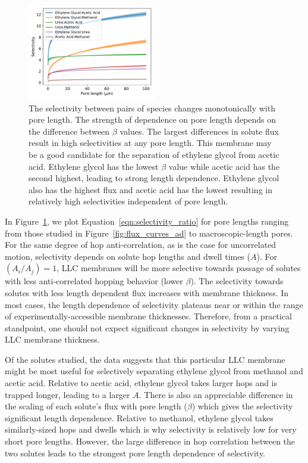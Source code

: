 \documentclass[aps,pre,preprint,groupedaddress,longbibliography]{revtex4-2}
\begin{document}
  \begin{figure}
  \centering
  \includegraphics[width=0.5\textwidth]{selectivity.pdf}
  \caption{The selectivity between pairs of species changes monotonically with
	  pore length. The strength of dependence on pore length depends on
	  the difference between $\beta$ values. The largest differences in solute
	  flux result in high selectivities at any pore length. This membrane
	  may be a good candidate for the separation of ethylene glycol from
	  acetic acid. Ethylene glycol has the lowest $\beta$ value while
	  acetic acid has the second highest, leading to strong length
	  dependence. Ethylene glycol also has the highest flux and acetic acid
	  has the lowest resulting in relatively high selectivities independent
	  of pore length.}
  \label{fig:selectivity}
  \end{figure}
   
  In Figure~\ref{fig:selectivity}, we plot Equation~\ref{eqn:selectivity_ratio}
  for pore lengths ranging from those studied in
  Figure~\ref{fig:flux_curves_ad} to macroscopic-length pores. For the same
  degree of hop anti-correlation, as is the case for uncorrelated motion,
  selectivity depends on solute hop lengths and dwell times ($A$). For $(A_i /
  A_j)=1$, LLC membranes will be more selective towards passage of solutes with
  less anti-correlated hopping behavior (lower $\beta$). The selectivity
  towards solutes with less length dependent flux increases with membrane
  thickness. In most cases, the length dependence of selectivity plateaus near
  or within the range of experimentally-accessible membrane thicknesses.
  Therefore, from a practical standpoint, one should not expect significant
  changes in selectivity by varying LLC membrane thickness. 
  
  Of the solutes studied, the data suggests that this particular LLC membrane 
  might be most useful for selectively separating ethylene glycol from methanol
  and acetic acid. Relative to acetic acid, ethylene glycol takes larger hops 
  and is trapped longer, leading to a larger $A$. There is also an appreciable 
  difference in the scaling of each solute's flux with pore length ($\beta$) 
  which gives the selectivity significant length dependence. Relative to methanol,
  ethylene glycol takes similarly-sized hops and dwells which is why selectivity
  is relatively low for very short pore lengths. However, the large difference in
  hop correlation between the two solutes leads to the strongest pore length 
  dependence of selectivity. 
  
\end{document}

